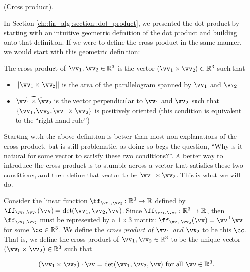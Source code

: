 \begin{deriv}
    (Cross product). 
    
    In Section \ref{ch::lin_alg::section::dot_product}, we presented the dot product by starting with an intuitive geometric definition of the dot product and building onto that definition. If we were to define the cross product in the same manner, we would start with this geometric definition:
    
    \vspace{.25cm}
    
    \begin{addmargin}[3em]{2em}
        The cross product of $\vv_1, \vv_2 \in \R^3$ is the vector $(\vv_1 \times \vv_2) \in \R^3$ such that

        \begin{itemize}
            \item $||\vv_1 \times \vv_2||$ is the area of the parallelogram spanned by $\vv_1$ and $\vv_2$
            \item $\widehat{\vv_1 \times \vv_2}$ is the vector perpendicular to $\vv_1$ and $\vv_2$ such that $\{\vv_1, \vv_2, \vv_1 \times \vv_2\}$ is positively oriented (this condition is equivalent to the ``right hand rule'')
        \end{itemize}
    \end{addmargin}
    
    Starting with the above definition is better than most non-explanations of the cross product, but is still problematic, as doing so begs the question, ``Why is it natural for some vector to satisfy these two conditions?''. A better way to introduce the cross product is to stumble across a vector that satisfies these two conditions, and then define that vector to be $\vv_1 \times \vv_2$. This is what we will do.

    Consider the linear function $\ff_{\vv_1,\vv_2}:\R^3 \rightarrow \R$ defined by $\ff_{\vv_1,\vv_2}(\vv) = \det(\vv_1, \vv_2, \vv)$. Since ${\ff_{\vv_1,\vv_2}:\R^3 \rightarrow \R}$, then $\ff_{\vv_1,\vv_2}$ must be represented by a $1 \times 3$ matrix: $\ff_{\vv_1, \vv_2}(\vv) = \vv^\top \vv$ for some $\cc \in \R^3$. We define the \textit{cross product of $\vv_1$ and $\vv_2$} to be this $\cc$. That is, we define the cross product of $\vv_1, \vv_2 \in \R^3$ to be the unique vector $(\vv_1 \times \vv_2) \in \R^3$ such that
    
    \begin{align*}
        (\vv_1 \times \vv_2) \cdot \vv = \det(\vv_1, \vv_2, \vv) \text{ for all $\vv \in \R^3$}.
    \end{align*}
\end{deriv}

